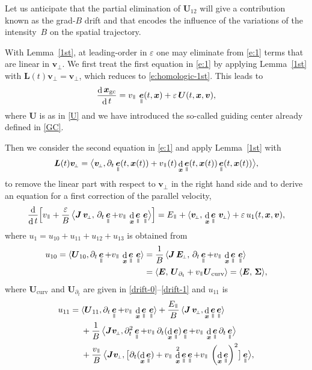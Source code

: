 \documentclass[JEP,XML,SOM,Unicode]{cedram}
\newcommand{\sperp}{{\scriptscriptstyle\perp}}
\newcommand{\blangle}{\bigl\langle}
\newcommand{\brangle}{\bigr\rangle}
\let\eps\varepsilon
\let\d\partial
\DeclareMathOperator\dD{d}\let\dd\dD
\theoremstyle{plain}
\theoremstyle{definition}
\newcommand{\be}{\begin{equation}}
\newcommand{\ee}{\end{equation}}
\newcommand\bE{{\boldsymbol E}}
\newcommand\bJ{{\boldsymbol J}}
\newcommand\bL{{\boldsymbol L}}
\newcommand\bU{{\boldsymbol U}}
\newcommand\bfv{{\boldsymbol v}}
\newcommand\bfx{{\boldsymbol x}}
\newcommand\Sig{{\boldsymbol \Sigma}}
\DeclareMathOperator{\beD}{\boldsymbol{e}}
\newcommand\eDpar{\beD_\mypar}
\newcommand\vpar{v_\mypar}
\newcommand\bvperp{\bfv_{\!\sperp}}
\newcommand\Epar{E_\mypar}
\newcommand\Eperp{\bE_{\!\sperp}}
\newcommand{\GC}{\bfx_\mathrm{gc}}
\newcommand{\curvB}{\bU_{\mathrm{curv}}}
\newcommand{\dtB}{\bU_{\d_t}}
\newcommand{\mypar}{{\mkern3mu\vphantom{\perp}\vrule depth 0pt\mkern2mu\vrule depth 0pt\mkern3mu}}
\begin{document}
Let us anticipate that the partial elimination of $\bU_{12}$ will give a contribution known as the grad-$B$ drift and that encodes the influence of the variations of the intensity~$B$ on the spatial trajectory.

With Lemma~\ref{1st}, at leading-order in $\eps$ one may eliminate from \eqref{e:1} terms that are linear in $\bvperp$. We first treat the first equation in \eqref{e:1} by applying Lemma~\ref{1st} with $\bL(t)\bvperp=\bvperp$, which reduces to \eqref{e:homologic-1st}. This leads to
\be\label{e:x}
\frac{\dD \GC}{\dD t}=\vpar\,\eDpar(t,\bfx) +\eps\,\bU(t,\bfx,\bfv),
\ee
where $\bU$ is as in \eqref{U} and we have introduced the so-called
guiding center already defined in \eqref{GC}.

Then we consider the
second equation in \eqref{e:1} and apply Lemma~\ref{1st} with
\[
\bL(t)\bvperp=\blangle\bvperp,\d_t\eDpar(t,\bfx(t))+\vpar(t)\dD_{\bfx}\eDpar(t,\bfx(t))\eDpar(t,\bfx(t))\brangle,
\]
to remove the linear part with respect to $\bvperp$ in the right hand
side and to derive an equation for a first correction of the parallel velocity,
\begin{align}
\label{e:vp}
\frac{\dD }{\dD t}\Bigl[\vpar
+\frac{\eps}{B}\,\blangle\bJ\,\bvperp,\,\d_t\eDpar+\vpar\,\dD_{\bfx}\eDpar\,\eDpar\brangle\Bigr] =\Epar+\langle\bvperp,\,\dD_{\bfx}\eDpar\,\bvperp\rangle
+\eps \,u_1(t,\bfx,\bfv),
\end{align}
where $u_1=u_{10}+u_{11}+u_{12}+u_{13}$ is obtained from
\begin{align*}
u_{10}=\langle\bU_{10},\d_t\eDpar+\vpar\,\dD_{\bfx}\eDpar\,\eDpar\rangle&=\frac{1}{B}\,\langle {\bJ}\,\Eperp,\,\d_t\eDpar+\vpar\,\dD_{\bfx}\eDpar\,\eDpar\rangle
\\
&= \langle \bE,\, \dtB + \vpar \curvB\rangle
=\langle \bE,\,\Sig\rangle,
\end{align*}
where $\curvB$ and $\dtB$ are given in \eqref{drift-0}--\eqref{drift-1} and $u_{11}$ is
\begin{align*}
 u_{11} ={}&\langle \bU_{11},
\d_t\eDpar+\vpar\,\dD_{\bfx}\eDpar\,\eDpar\rangle
+\frac{\Epar}{B}\,\langle {\bJ}\,\bvperp, \dD_{\bfx}\eDpar\eDpar\rangle
\\
&+\frac{1}{B}\, \blangle
\bJ\bvperp,\d_t^2\eDpar+\vpar\,\d_t(\dD_{\bfx}\eDpar)\eDpar+\vpar\,\dD_{\bfx}\eDpar\d_t\eDpar\brangle
\\
&+\frac{\vpar}{B}\, \blangle
\bJ\bvperp,\bigl[\d_t(\dD_\bfx\eDpar)+\vpar\,\dD_{\bfx}^2\eDpar\eDpar+\vpar\,\left(\dD_{\bfx}\eDpar\right)^2\bigr]\eDpar\brangle,
\end{align*}
\end{document}
